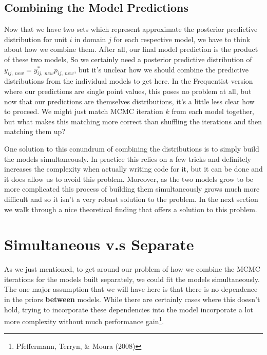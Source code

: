 \documentclass[12pt,twoside]{reedthesis}
\begin{document}
\hypertarget{combining-the-model-predictions}{%
\subsection{Combining the Model Predictions}\label{combining-the-model-predictions}}

Now that we have two sets which represent approximate the posterior predictive distribution for unit \(i\) in domain \(j\) for each respective model, we have to think about how we combine them. After all, our final model prediction is the product of these two models, So we certainly need a posterior predictive distribution of \(y_{ij, \ new} = y_{ij, \ new}^*p_{ij, \ new}\), but it's unclear how we should combine the predictive distributions from the individual models to get here. In the Frequentist version where our predictions are single point values, this poses no problem at all, but now that our predictions are themselves distributions, it's a little less clear how to proceed. We might just match MCMC iteration \(k\) from each model together, but what makes this matching more correct than shuffling the iterations and then matching them up?

One solution to this conundrum of combining the distributions is to simply build the models simultaneously. In practice this relies on a few tricks and definitely increases the complexity when actually writing code for it, but it can be done and it does allow us to avoid this problem. Moreover, as the two models grow to be more complicated this process of building them simultaneously grows much more difficult and so it isn't a very robust solution to the problem. In the next section we walk through a nice theoretical finding that offers a solution to this problem.

\hypertarget{simultaneous-v.s-separate}{%
\section{Simultaneous v.s Separate}\label{simultaneous-v.s-separate}}

As we just mentioned, to get around our problem of how we combine the MCMC iterations for the models built separately, we could fit the models simultaneously. The one major assumption that we will have here is that there is no dependence in the priors \textbf{between} models. While there are certainly cases where this doesn't hold, trying to incorporate these dependencies into the model incorporate a lot more complexity without much performance gain\footnote{Pfeffermann, Terryn, \& Moura (2008)}.
\end{document}
